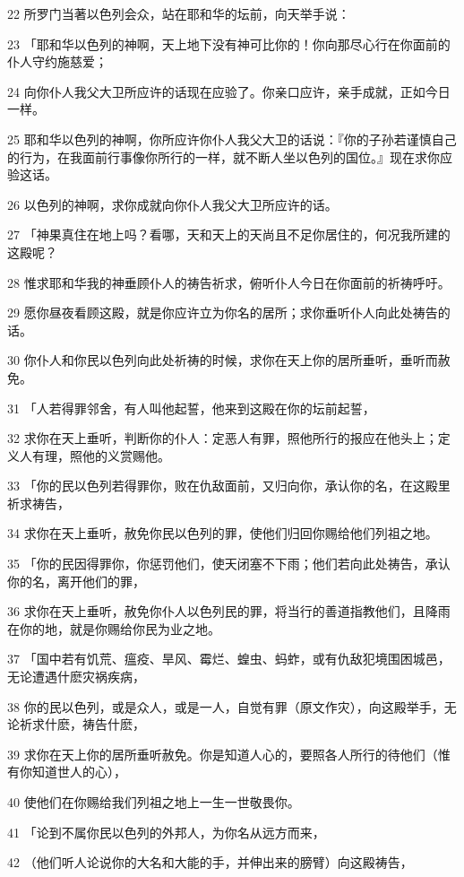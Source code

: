 \par 22 所罗门当著以色列会众，站在耶和华的坛前，向天举手说：
\par 23 「耶和华以色列的神啊，天上地下没有神可比你的！你向那尽心行在你面前的仆人守约施慈爱；
\par 24 向你仆人我父大卫所应许的话现在应验了。你亲口应许，亲手成就，正如今日一样。
\par 25 耶和华以色列的神啊，你所应许你仆人我父大卫的话说：『你的子孙若谨慎自己的行为，在我面前行事像你所行的一样，就不断人坐以色列的国位。』现在求你应验这话。
\par 26 以色列的神啊，求你成就向你仆人我父大卫所应许的话。
\par 27 「神果真住在地上吗？看哪，天和天上的天尚且不足你居住的，何况我所建的这殿呢？
\par 28 惟求耶和华我的神垂顾仆人的祷告祈求，俯听仆人今日在你面前的祈祷呼吁。
\par 29 愿你昼夜看顾这殿，就是你应许立为你名的居所；求你垂听仆人向此处祷告的话。
\par 30 你仆人和你民以色列向此处祈祷的时候，求你在天上你的居所垂听，垂听而赦免。
\par 31 「人若得罪邻舍，有人叫他起誓，他来到这殿在你的坛前起誓，
\par 32 求你在天上垂听，判断你的仆人：定恶人有罪，照他所行的报应在他头上；定义人有理，照他的义赏赐他。
\par 33 「你的民以色列若得罪你，败在仇敌面前，又归向你，承认你的名，在这殿里祈求祷告，
\par 34 求你在天上垂听，赦免你民以色列的罪，使他们归回你赐给他们列祖之地。
\par 35 「你的民因得罪你，你惩罚他们，使天闭塞不下雨；他们若向此处祷告，承认你的名，离开他们的罪，
\par 36 求你在天上垂听，赦免你仆人以色列民的罪，将当行的善道指教他们，且降雨在你的地，就是你赐给你民为业之地。
\par 37 「国中若有饥荒、瘟疫、旱风、霉烂、蝗虫、蚂蚱，或有仇敌犯境围困城邑，无论遭遇什麽灾祸疾病，
\par 38 你的民以色列，或是众人，或是一人，自觉有罪（原文作灾），向这殿举手，无论祈求什麽，祷告什麽，
\par 39 求你在天上你的居所垂听赦免。你是知道人心的，要照各人所行的待他们（惟有你知道世人的心），
\par 40 使他们在你赐给我们列祖之地上一生一世敬畏你。
\par 41 「论到不属你民以色列的外邦人，为你名从远方而来，
\par 42 （他们听人论说你的大名和大能的手，并伸出来的膀臂）向这殿祷告，
